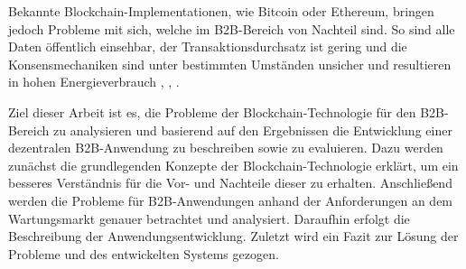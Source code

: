 Bekannte Blockchain-Implementationen, wie Bitcoin oder Ethereum, bringen jedoch Probleme mit sich, welche im B2B-Bereich von Nachteil sind. So sind alle Daten öffentlich einsehbar, der Transaktionsdurchsatz ist gering und die Konsensmechaniken sind unter bestimmten Umständen unsicher und resultieren in hohen Energieverbrauch \cite{AntonopoulosMasteringBitcoinUnlocking2017}, \cite{NakamotoBitcoinPeertoPeerElectronic2008}, \cite{EthereumWhitepaper2017}. 

Ziel dieser Arbeit ist es, die Probleme der Blockchain-Technologie für den B2B-Bereich zu analysieren und basierend auf den Ergebnissen die Entwicklung einer dezentralen B2B-Anwendung zu beschreiben sowie zu evaluieren. Dazu werden zunächst die grundlegenden Konzepte der Blockchain-Technologie erklärt, um ein besseres Verständnis für die Vor- und Nachteile dieser zu erhalten. Anschließend werden die Probleme für B2B-Anwendungen anhand der Anforderungen an dem Wartungsmarkt genauer betrachtet und analysiert. Daraufhin erfolgt die Beschreibung der Anwendungsentwicklung. Zuletzt wird ein Fazit zur Lösung der Probleme und des entwickelten Systems gezogen.
